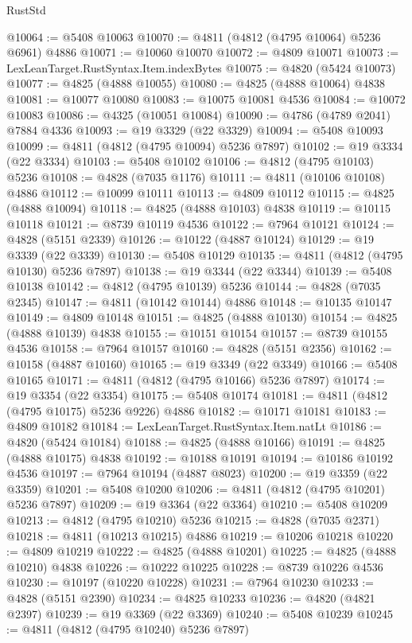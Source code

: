\begin{lexlean}{RustStd}
\begin{coremodule}
@10064 := @5408 @10063
@10070 := @4811 (@4812 (@4795 @10064) @5236 @6961) @4886
@10071 := @10060 @10070
@10072 := @4809 @10071
@10073 := LexLeanTarget.RustSyntax.Item.indexBytes
@10075 := @4820 (@5424 @10073)
@10077 := @4825 (@4888 @10055)
@10080 := @4825 (@4888 @10064) @4838
@10081 := @10077 @10080
@10083 := @10075 @10081 @4536
@10084 := @10072 @10083
@10086 := @4325 (@10051 @10084)
@10090 := @4786 (@4789 @2041) @7884 @4336
@10093 := @19 @3329 (@22 @3329)
@10094 := @5408 @10093
@10099 := @4811 (@4812 (@4795 @10094) @5236 @7897)
@10102 := @19 @3334 (@22 @3334)
@10103 := @5408 @10102
@10106 := @4812 (@4795 @10103) @5236
@10108 := @4828 (@7035 @1176)
@10111 := @4811 (@10106 @10108) @4886
@10112 := @10099 @10111
@10113 := @4809 @10112
@10115 := @4825 (@4888 @10094)
@10118 := @4825 (@4888 @10103) @4838
@10119 := @10115 @10118
@10121 := @8739 @10119 @4536
@10122 := @7964 @10121
@10124 := @4828 (@5151 @2339)
@10126 := @10122 (@4887 @10124)
@10129 := @19 @3339 (@22 @3339)
@10130 := @5408 @10129
@10135 := @4811 (@4812 (@4795 @10130) @5236 @7897)
@10138 := @19 @3344 (@22 @3344)
@10139 := @5408 @10138
@10142 := @4812 (@4795 @10139) @5236
@10144 := @4828 (@7035 @2345)
@10147 := @4811 (@10142 @10144) @4886
@10148 := @10135 @10147
@10149 := @4809 @10148
@10151 := @4825 (@4888 @10130)
@10154 := @4825 (@4888 @10139) @4838
@10155 := @10151 @10154
@10157 := @8739 @10155 @4536
@10158 := @7964 @10157
@10160 := @4828 (@5151 @2356)
@10162 := @10158 (@4887 @10160)
@10165 := @19 @3349 (@22 @3349)
@10166 := @5408 @10165
@10171 := @4811 (@4812 (@4795 @10166) @5236 @7897)
@10174 := @19 @3354 (@22 @3354)
@10175 := @5408 @10174
@10181 := @4811 (@4812 (@4795 @10175) @5236 @9226) @4886
@10182 := @10171 @10181
@10183 := @4809 @10182
@10184 := LexLeanTarget.RustSyntax.Item.natLt
@10186 := @4820 (@5424 @10184)
@10188 := @4825 (@4888 @10166)
@10191 := @4825 (@4888 @10175) @4838
@10192 := @10188 @10191
@10194 := @10186 @10192 @4536
@10197 := @7964 @10194 (@4887 @8023)
@10200 := @19 @3359 (@22 @3359)
@10201 := @5408 @10200
@10206 := @4811 (@4812 (@4795 @10201) @5236 @7897)
@10209 := @19 @3364 (@22 @3364)
@10210 := @5408 @10209
@10213 := @4812 (@4795 @10210) @5236
@10215 := @4828 (@7035 @2371)
@10218 := @4811 (@10213 @10215) @4886
@10219 := @10206 @10218
@10220 := @4809 @10219
@10222 := @4825 (@4888 @10201)
@10225 := @4825 (@4888 @10210) @4838
@10226 := @10222 @10225
@10228 := @8739 @10226 @4536
@10230 := @10197 (@10220 @10228)
@10231 := @7964 @10230
@10233 := @4828 (@5151 @2390)
@10234 := @4825 @10233
@10236 := @4820 (@4821 @2397)
@10239 := @19 @3369 (@22 @3369)
@10240 := @5408 @10239
@10245 := @4811 (@4812 (@4795 @10240) @5236 @7897)

\end{coremodule}
\end{lexlean}
